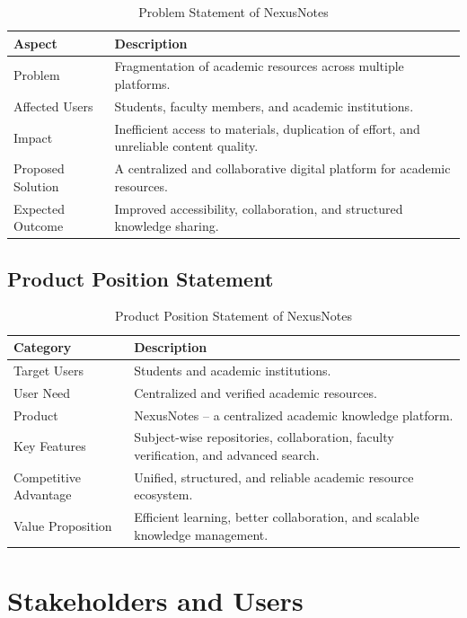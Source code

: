 \documentclass[12pt,a4paper]{report}
\begin{document}
\begin{table}[h]
\centering
\begin{tabular}{|l|p{9cm}|}
\hline
Aspect & Description \\
\hline
Problem & Fragmentation of academic resources across multiple platforms. \\
\hline
Affected Users & Students, faculty members, and academic institutions. \\
\hline
Impact & Inefficient access to materials, duplication of effort, and unreliable content quality. \\
\hline
Proposed Solution & A centralized and collaborative digital platform for academic resources. \\
\hline
Expected Outcome & Improved accessibility, collaboration, and structured knowledge sharing. \\
\hline
\end{tabular}
\caption{Problem Statement of NexusNotes}
\end{table}
\newpage
\section{Product Position Statement}

\begin{table}[h]
\centering
\begin{tabular}{|l|p{9cm}|}
\hline
Category & Description \\
\hline
Target Users & Students and academic institutions. \\
\hline
User Need & Centralized and verified academic resources. \\
\hline
Product & NexusNotes – a centralized academic knowledge platform. \\
\hline
Key Features & Subject-wise repositories, collaboration, faculty verification, and advanced search. \\
\hline
Competitive Advantage & Unified, structured, and reliable academic resource ecosystem. \\
\hline
Value Proposition & Efficient learning, better collaboration, and scalable knowledge management. \\
\hline
\end{tabular}
\caption{Product Position Statement of NexusNotes}
\end{table}


\chapter{Stakeholders and Users}
\end{document}
